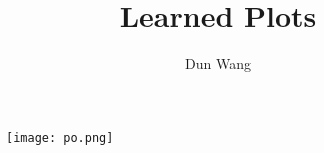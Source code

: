 \documentclass[]{article}
\begin{document}
\title{Learned Plots}
\author{Dun Wang}
\maketitle

\begin{figure}[H]
\centering
\texttt{[image: po.png]}
\caption{}
\end{figure}
\end{document}
